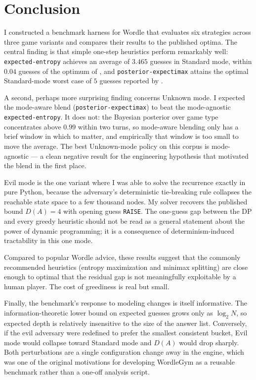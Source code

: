 \documentclass[11pt]{article}
\begin{document}
\section*{Conclusion}

I constructed a benchmark harness for Wordle that evaluates six
strategies across three game variants and compares their results to
the published optima. The central finding is that simple one-step
heuristics perform remarkably well: \texttt{expected-entropy}
achieves an average of $3.465$ guesses in Standard mode, within
$0.04$ guesses of the optimum of \citet{bertsimas2022wordle}, and
\texttt{posterior-expectimax} attains the optimal Standard-mode
worst case of $5$ guesses reported by \citet{selby2022wordle}.

A second, perhaps more surprising finding concerns Unknown mode. I
expected the mode-aware blend (\texttt{posterior-expectimax}) to
beat the mode-agnostic \texttt{expected-entropy}. It does not: the
Bayesian posterior over game type concentrates above $0.99$ within
two turns, so mode-aware blending only has a brief window in which
to matter, and empirically that window is too small to move the
average. The best Unknown-mode policy on this corpus is
mode-agnostic --- a clean negative result for the engineering
hypothesis that motivated the blend in the first place.

Evil mode is the one variant where I was able to solve the recurrence
exactly in pure Python, because the adversary's deterministic
tie-breaking rule collapses the reachable state space to a few
thousand nodes. My solver recovers the published bound $D(A) = 4$
with opening guess \texttt{RAISE}. The one-guess gap between the DP
and every greedy heuristic should not be read as a general statement
about the power of dynamic programming; it is a consequence of
determinism-induced tractability in this one mode.

Compared to popular Wordle advice, these results suggest that the
commonly recommended heuristics (entropy maximization and minimax
splitting) are close enough to optimal that the residual gap is not
meaningfully exploitable by a human player. The cost of greediness is
real but small.

Finally, the benchmark's response to modeling changes is itself
informative. The information-theoretic lower bound on expected guesses
grows only as $\log_2 N$, so expected depth is relatively insensitive
to the size of the answer list. Conversely, if the evil adversary were
redefined to prefer the smallest consistent bucket, Evil mode would
collapse toward Standard mode and $D(A)$ would drop sharply. Both
perturbations are a single configuration change away in the engine,
which was one of the original motivations for developing WordleGym as
a reusable benchmark rather than a one-off analysis script.
\end{document}
